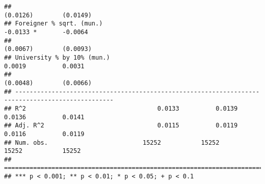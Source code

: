 \documentclass[
]{article}
\begin{document}
\begin{verbatim}
##                                                                       (0.0126)        (0.0149)   
## Foreigner % sqrt. (mun.)                                              -0.0133 *       -0.0064    
##                                                                       (0.0067)        (0.0093)   
## University % by 10% (mun.)                                             0.0019          0.0031    
##                                                                       (0.0048)        (0.0066)   
## -------------------------------------------------------------------------------------------------
## R^2                                    0.0133          0.0139          0.0136          0.0141    
## Adj. R^2                               0.0115          0.0119          0.0116          0.0119    
## Num. obs.                          15252           15252           15252           15252         
## =================================================================================================
## *** p < 0.001; ** p < 0.01; * p < 0.05; + p < 0.1
\end{verbatim}
\end{document}
